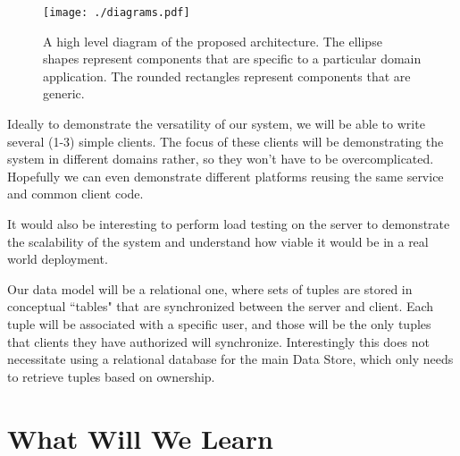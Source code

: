 \documentclass[12pt]{article}
\begin{document}
    \begin{figure}[h]
        \centering
        \texttt{[image: ./diagrams.pdf]}
        \caption{A high level diagram of the proposed architecture. The ellipse shapes represent components that are specific to a particular domain application. The rounded rectangles represent components that are generic. \label{fig:high-level}}
    \end{figure}

    Ideally to demonstrate the versatility of our system, we will be able to write several (1-3) simple clients.
    The focus of these clients will be demonstrating the system in different domains rather, so they won't have to be overcomplicated.
    Hopefully we can even demonstrate different platforms reusing the same service and common client code.

    It would also be interesting to perform load testing on the server to demonstrate the scalability of the system and understand how viable it would be in a real world deployment.

    Our data model will be a relational one, where sets of tuples are stored in conceptual ``tables" that are synchronized between the server and client.
    Each tuple will be associated with a specific user, and those will be the only tuples that clients they have authorized will synchronize.
    Interestingly this does not necessitate using a relational database for the main Data Store, which only needs to retrieve tuples based on ownership.

    \section{What Will We Learn}
\end{document}
